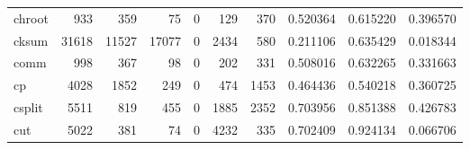 \begin{tabular}{lrrrrrrrrr}
chroot    &                                 933 &                                             359 &                                             75 &                                             0 &                                            129 &                                          370 &                                           0.520364 &                               0.615220 &                             0.396570 \\
cksum     &                               31618 &                                           11527 &                                          17077 &                                             0 &                                           2434 &                                          580 &                                           0.211106 &                               0.635429 &                             0.018344 \\
comm      &                                 998 &                                             367 &                                             98 &                                             0 &                                            202 &                                          331 &                                           0.508016 &                               0.632265 &                             0.331663 \\
cp        &                                4028 &                                            1852 &                                            249 &                                             0 &                                            474 &                                         1453 &                                           0.464436 &                               0.540218 &                             0.360725 \\
csplit    &                                5511 &                                             819 &                                            455 &                                             0 &                                           1885 &                                         2352 &                                           0.703956 &                               0.851388 &                             0.426783 \\
cut       &                                5022 &                                             381 &                                             74 &                                             0 &                                           4232 &                                          335 &                                           0.702409 &                               0.924134 &                             0.066706 \\

\end{tabular}
